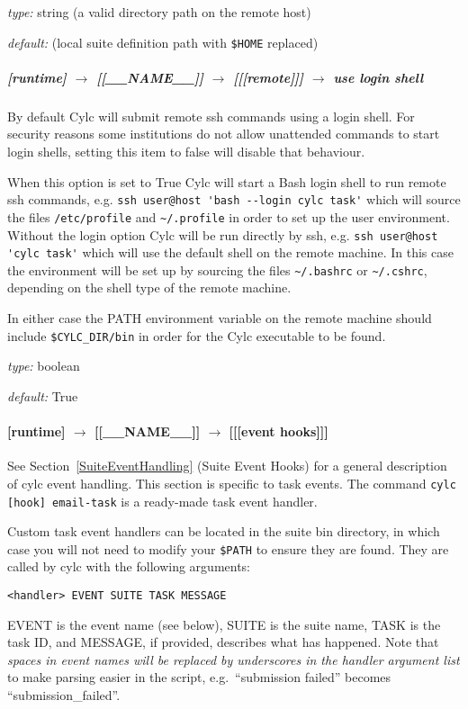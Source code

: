 \begin{myitemize}
\item {\em type:} string (a valid directory path on the remote host)
\item {\em default:} (local suite definition path with \lstinline=$HOME=
    replaced)
\end{myitemize}
 

\subparagraph[ssh messaging]{[runtime] $\rightarrow$ [[\_\_NAME\_\_]] $\rightarrow$ [[[remote]]] $\rightarrow$ use login shell}

By default Cylc will submit remote ssh commands using a login shell. For
security reasons some institutions do not allow unattended commands to start
login shells, setting this item to false will disable that behaviour.

When this option is set to True Cylc will start a Bash login shell to run
remote ssh commands, e.g. \lstinline=ssh user@host 'bash --login cylc task'=
which will source the files \lstinline=/etc/profile= and \lstinline=~/.profile=
in order to set up the user environment. Without the login option Cylc will be
run directly by ssh, e.g. \lstinline=ssh user@host 'cylc task'= which will use
the default shell on the remote machine. In this case the environment will be
set up by sourcing the files \lstinline=~/.bashrc= or \lstinline=~/.cshrc=,
depending on the shell type of the remote machine.

In either case the PATH environment variable on the remote machine should
include \lstinline=$CYLC_DIR/bin= in order for the Cylc executable to be
found.

\begin{myitemize}
\item {\em type:} boolean
\item {\em default:} True
\end{myitemize}

\paragraph[{[[[}event hooks{]]]}]{[runtime] $\rightarrow$ [[\_\_NAME\_\_]] $\rightarrow$ [[[event hooks]]]}
\label{TaskEventHandling}

See Section~\ref{SuiteEventHandling} (Suite Event Hooks) for a general
description of cylc event handling. This section is specific to task events. 
The command \lstinline=cylc [hook] email-task= is a ready-made task event 
handler. 

Custom task event handlers can be located in the suite bin directory,  
in which case you will not need to modify your \lstinline=$PATH= to ensure
they are found.  They are called by cylc with the following arguments:
\begin{lstlisting}
<handler> EVENT SUITE TASK MESSAGE
\end{lstlisting}
EVENT is the event name (see below), SUITE is the suite name, TASK 
is the task ID, and MESSAGE, if provided, describes what has happened.
Note that {\em spaces in event names will be replaced by underscores 
in the handler argument list} to make parsing easier in the script,
e.g.\ ``submission failed'' becomes ``submission\_failed''.

